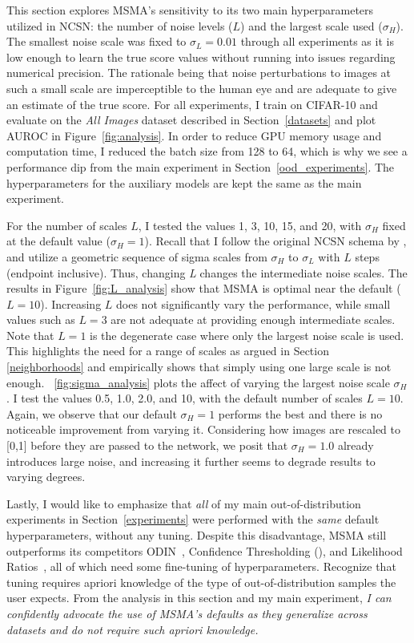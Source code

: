 This section explores MSMA's sensitivity to its two main hyperparameters utilized in NCSN: the number of noise levels ($L$) and the largest scale used ($\sigma_H$). The smallest noise scale was fixed to $\sigma_L=0.01$ through all experiments as it is low enough to learn the true score values without running into issues regarding numerical precision. The rationale being that noise perturbations to images at such a small scale are imperceptible to the human eye and are adequate to give an estimate of the true score. For all experiments, I train on CIFAR-10 and evaluate on the \emph{All Images} dataset described in Section~\ref{datasets} and plot AUROC in Figure~\ref{fig:analysis}. In order to reduce GPU memory usage and computation time, I reduced the batch size from 128 to 64, which is why we see a performance dip from the main experiment in Section~\ref{ood_experiments}. The hyperparameters for the auxiliary models are kept the same as the main experiment.

For the number of scales $L$, I tested the values 1, 3, 10, 15, and 20, with $\sigma_H$ fixed at the default value ($\sigma_H=1$). Recall that I follow the original NCSN schema by \cite{Song2019}, and utilize a geometric sequence of sigma scales from $\sigma_H$ to $\sigma_L$ with $L$ steps (endpoint inclusive). Thus, changing \emph{L} changes the intermediate noise scales. The results in Figure~\ref{fig:L_analysis} show that MSMA is optimal near the default ($L=10$). Increasing $L$ does not significantly vary the performance, while small values such as $L=3$ are not adequate at providing enough intermediate scales. Note that $L=1$ is the degenerate case where only the largest noise scale is used. This highlights the need for a range of scales as argued in Section \ref{neighborhoods} and empirically shows that simply using one large scale is not enough. \figurename{~\ref{fig:sigma_analysis}} plots the affect of varying the largest noise scale $\sigma_H$. I test the values 0.5, 1.0, 2.0, and 10, with the default number of scales $L=10$. Again, we observe that our default $\sigma_H=1$ performs the best and there is no noticeable improvement from varying it. Considering how images are rescaled to [0,1] before they are passed to the network, we posit that $\sigma_H=1.0$ already introduces large noise, and increasing it further seems to degrade results to varying degrees. 

Lastly, I would like to emphasize that \emph{all} of my main out-of-distribution experiments in Section~\ref{experiments} were performed with the \emph{same} default hyperparameters, without any tuning. Despite this disadvantage, MSMA still outperforms its competitors ODIN~\cite{Liang2017}, Confidence Thresholding (\cite{Devries}), and Likelihood Ratios~\cite{Ren2019}, all of which need some fine-tuning of hyperparameters. Recognize that tuning requires apriori knowledge of the type of out-of-distribution samples the user expects. From the analysis in this section and my main experiment, \textit{I can confidently advocate the use of MSMA's defaults as they generalize across datasets and do not require such apriori knowledge.} 

